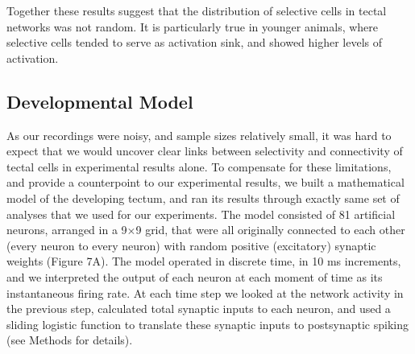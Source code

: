\documentclass{article}
\begin{document}
Together these results suggest that the distribution of selective cells in tectal networks was not random. It is particularly true in younger animals, where selective cells tended to serve as activation sink, and showed higher levels of activation.


\subsection*{Developmental Model}

As our recordings were noisy, and sample sizes relatively small, it was hard to expect that we would uncover clear links between selectivity and connectivity of tectal cells in experimental results alone. To compensate for these limitations, and provide a counterpoint to our experimental results, we built a mathematical model of the developing tectum, and ran its results through exactly same set of analyses that we used for our experiments. The model consisted of 81 artificial neurons, arranged in a 9$\times$9 grid, that were all originally connected to each other (every neuron to every neuron) with random positive (excitatory) synaptic weights (Figure 7A). The model operated in discrete time, in 10 ms increments, and we interpreted the output of each neuron at each moment of time as its instantaneous firing rate. At each time step we looked at the network activity in the previous step, calculated total synaptic inputs to each neuron, and used a sliding logistic function to translate these synaptic inputs to postsynaptic spiking (see Methods for details).
\end{document}
